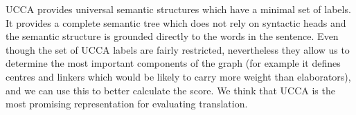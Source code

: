 \documentclass[11pt,letterpaper]{article}
\begin{document}
{UCCA provides universal semantic structures which 
have
a minimal set of labels. It provides a complete semantic tree which does not rely on syntactic heads and the semantic structure is grounded directly to the words in the sentence. 
 Even though the set of UCCA labels are fairly restricted,  nevertheless they allow us to determine the most important components of the graph (for example it defines centres and linkers which would be likely to carry more weight than elaborators), and we can use this to better calculate the score. 
We think that UCCA is the
most promising representation for evaluating translation. 
}





\end{document}
